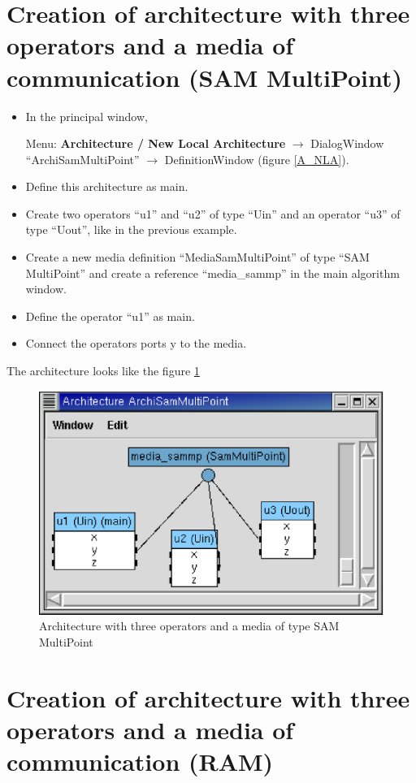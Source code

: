 \documentclass[a4paper,twoside]{report}
\begin{document}
\section{Creation of architecture with three operators and a media of communication (SAM MultiPoint)} 
\label{archi1_3_SMP}

\begin{itemize}
\item In the principal window, 

Menu: \textbf{Architecture / New Local Architecture} $\rightarrow$
DialogWindow ``ArchiSamMultiPoint'' $\rightarrow$ DefinitionWindow (figure
\ref{A_NLA}).

\item Define this architecture as main.

\item Create two operators ``u1'' and ``u2'' of type ``Uin'' and an operator
``u3'' of type ``Uout'', like in the previous example.
\item Create a new media definition ``MediaSamMultiPoint'' of type ``SAM
MultiPoint'' and create a reference ``media\_sammp'' in the main algorithm
window.
\item Define the operator ``u1'' as main.
\item Connect the operators ports y to the media.
\end{itemize}

The architecture looks like the figure \ref{archi1_3}

\begin{figure}[ht]
  \begin{center} 
        \includegraphics[width=0.56\linewidth]{architecture_ex1_3u_SMP.eps}
  \end{center} 
\caption{Architecture with three operators and a media of type SAM MultiPoint}
\label{archi1_3}
\end{figure}

\section{Creation of architecture with three operators and a media of
communication (RAM)}
\end{document}
